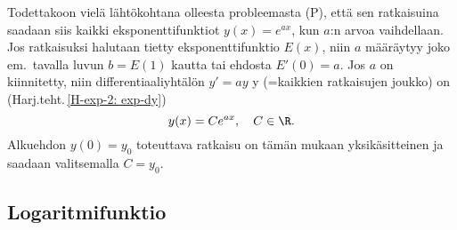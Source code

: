 Todettakoon vielä lähtökohtana olleesta probleemasta (P), että sen ratkaisuina saadaan siis 
kaikki eksponenttifunktiot $y(x)=e^{ax}$, kun $a$:n arvoa vaihdellaan. Jos ratkaisuksi
halutaan tietty eksponenttifunktio $E(x)$, niin $a$ määräytyy joko em.\ tavalla luvun
$b=E(1)$ kautta tai ehdosta $E'(0)=a$. Jos $a$ on kiinnitetty, niin differentiaaliyhtälön
$y'=ay$ y  (=kaikkien ratkaisujen joukko) on
(Harj.teht.\,\ref{H-exp-2: exp-dy})
\[
y(x)=Ce^{ax}, \quad C\in\R.
\]
Alkuehdon $y(0)=y_0$ toteuttava ratkaisu on tämän mukaan yksikäsitteinen ja saadaan
valitsemalla $C=y_0$.

\subsection*{Logaritmifunktio}

